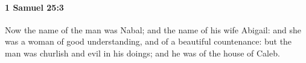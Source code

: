 
		\paragraph{1 Samuel 25:3} %
			\label{1SAMUEL-25-3}

			Now the name of the man was Nabal; and the name of his wife Abigail: and she was a woman of good understanding, and of a beautiful countenance: but the man was churlish and evil in his doings; and he was of the house of Caleb.


